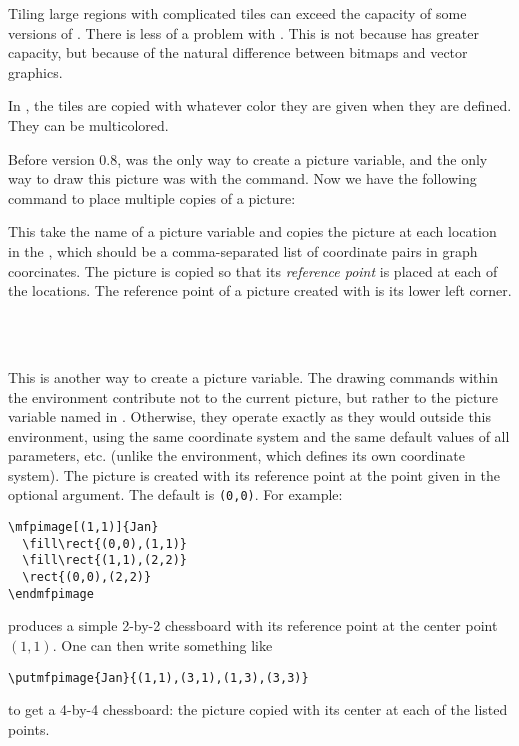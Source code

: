 \documentclass[letterpaper]{article}
\begin{document}
Tiling large regions with complicated tiles can exceed the capacity of
some versions of \MP{}. There is less of a problem with \MF{}. This is not
because \MF{} has greater capacity, but because of the natural
difference between bitmaps and vector graphics.

In \MP{}, the tiles are copied with whatever color they are given when
they are defined. They can be multicolored.

Before version 0.8,  was the only way to create a picture
variable, and the only way to draw this picture was with the 
command. Now we have the following command to place multiple copies of
a picture:

\begin{cd}
\end{cd}

This take the name of a picture variable and copies the picture at each
location in the , which should be a comma-separated list of
coordinate pairs in graph coorcinates. The picture is copied so that its
\emph{reference point} is placed at each of the locations. The reference
point of a picture created with  is its lower left corner.

\begin{cd}
  \\
  \ \\
%
\end{cd}

This is another way to create a picture variable. The drawing commands
within the  environment contribute not to the current
\mfp{} picture, but rather to the picture variable named in .
Otherwise, they operate exactly as they would outside this environment,
using the same coordinate system and the same default values of all
parameters, etc. (unlike the  environment, which defines its
own coordinate system). The picture is created with its reference point
at the point  given in the optional argument. The default is
\texttt{(0,0)}. For example:
\begin{verbatim}
\mfpimage[(1,1)]{Jan}
  \fill\rect{(0,0),(1,1)}
  \fill\rect{(1,1),(2,2)}
  \rect{(0,0),(2,2)}
\endmfpimage
\end{verbatim}
produces a simple 2-by-2 chessboard with its reference point at the
center point $(1,1)$. One can then write something like
\begin{verbatim}
\putmfpimage{Jan}{(1,1),(3,1),(1,3),(3,3)}
\end{verbatim}
to get a 4-by-4 chessboard: the picture  copied with its
center at each of the listed points.
\end{document}
